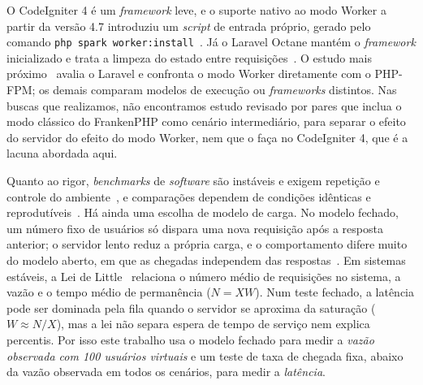 O CodeIgniter 4 é um \textit{framework} leve, e o suporte nativo ao modo Worker a partir da versão 4.7 introduziu um \textit{script} de entrada próprio, gerado pelo comando \texttt{php spark worker:install}~\cite{codeigniter2024}. Já o Laravel Octane mantém o \textit{framework} inicializado e trata a limpeza do estado entre requisições~\cite{otwell2024}. O estudo mais próximo~\cite{dhaniswara2025} avalia o Laravel e confronta o modo Worker diretamente com o PHP-FPM; os demais comparam modelos de execução ou \textit{frameworks} distintos. Nas buscas que realizamos, não encontramos estudo revisado por pares que inclua o modo clássico do FrankenPHP como cenário intermediário, para separar o efeito do servidor do efeito do modo Worker, nem que o faça no CodeIgniter 4, que é a lacuna abordada aqui.

Quanto ao rigor, \textit{benchmarks} de \textit{software} são instáveis e exigem repetição e controle do ambiente~\cite{laaber2021}, e comparações dependem de condições idênticas e reprodutíveis~\cite{zhan2022,brunst2022,jia2013}. Há ainda uma escolha de modelo de carga. No modelo fechado, um número fixo de usuários só dispara uma nova requisição após a resposta anterior; o servidor lento reduz a própria carga, e o comportamento difere muito do modelo aberto, em que as chegadas independem das respostas~\cite{schroeder2006,grafanaopen}. Em sistemas estáveis, a Lei de Little~\cite{little1961} relaciona o número médio de requisições no sistema, a vazão e o tempo médio de permanência ($N=XW$). Num teste fechado, a latência pode ser dominada pela fila quando o servidor se aproxima da saturação ($W\approx N/X$), mas a lei não separa espera de tempo de serviço nem explica percentis. Por isso este trabalho usa o modelo fechado para medir a \emph{vazão observada com 100 usuários virtuais} e um teste de taxa de chegada fixa, abaixo da vazão observada em todos os cenários, para medir a \emph{latência}.

